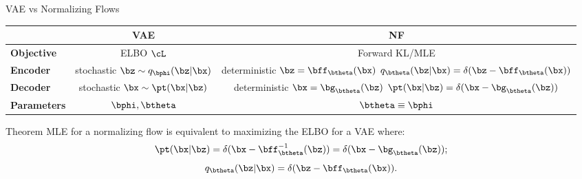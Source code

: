 \documentclass{beamer}
\begin{document}
\begin{frame}{VAE vs Normalizing Flows}
	\begin{table}[]
		\begin{tabular}{l|c|c}
			& \textbf{VAE} & \textbf{NF} \\ \hline
			\textbf{Objective} & ELBO $\cL$ & Forward KL/MLE \\ \hline
			\textbf{Encoder} & \shortstack{stochastic \\ $\bz \sim q_{\bphi}(\bz| \bx)$} &  \shortstack{\\ deterministic \\ $\bz = \bff_{\btheta}(\bx)$ \\ $q_{\btheta}(\bz| \bx) = \delta(\bz - \bff_{\btheta}(\bx))$}  \\ \hline
			\textbf{Decoder} & \shortstack{stochastic \\ $\bx \sim \pt(\bx| \bz)$} & \shortstack{\\ deterministic \\ $\bx = \bg_{\btheta}(\bz)$ \\ $ \pt(\bx | \bz) = \delta(\bx - \bg_{\btheta}(\bz))$} \\ \hline
			\textbf{Parameters}  & $\bphi, \btheta$ & $\btheta \equiv \bphi$\\ 
		\end{tabular}
	\end{table}
	\vspace{-0.3cm}
	\eqpause
	\begin{block}{Theorem}
		MLE for a normalizing flow is equivalent to maximizing the ELBO for a VAE where:
		\vspace{-0.3cm}
		\[
			\pt(\bx | \bz) = \delta (\bx - \bff^{-1}_{\btheta}(\bz)) = \delta (\bx - \bg_{\btheta}(\bz));
		\]
		\vspace{-0.5cm}
		\[
			q_{\btheta}(\bz| \bx) = \delta (\bz - \bff_{\btheta}(\bx)).
		\]
	\end{block}
\end{frame}
\end{document}
